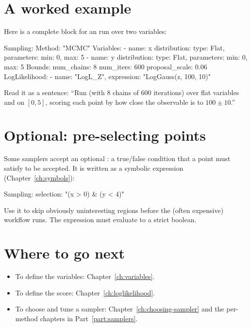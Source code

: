 \section{A worked example}
\label{sec:sampling-example}

Here is a complete  block for an  run over two variables:

\begin{yamlwin}
Sampling:
  Method: "MCMC"
  Variables:
    - name: x
      distribution: {type: Flat, parameters: {min: 0, max: 5}}
    - name: y
      distribution: {type: Flat, parameters: {min: 0, max: 5}}
  Bounds:
    num_chains: 8
    num_iters: 600
    proposal_scale: 0.06
  LogLikelihood:
    - {name: "LogL_Z", expression: "LogGauss(z, 100, 10)"}
\end{yamlwin}

\noindent Read it as a sentence: ``Run  (with 8 chains of 600 iterations) over flat
variables  and  on $[0,5]$, scoring each point by how close the observable
 is to $100 \pm 10$.''

\section{Optional: pre-selecting points}
\label{sec:sampling-selection}

Some samplers accept an optional : a true/false condition that a point must
satisfy to be accepted. It is written as a symbolic expression
(Chapter~\ref{ch:symbols}):

\begin{yamlwin}
Sampling:
  selection: "(x > 0) & (y < 4)"
\end{yamlwin}

\noindent Use it to skip obviously uninteresting regions before the (often expensive) workflow
runs. The expression must evaluate to a strict boolean.

\section{Where to go next}
\label{sec:sampling-next}

\begin{itemize}
  \item To define the variables: Chapter~\ref{ch:variables}.
  \item To define the score: Chapter~\ref{ch:loglikelihood}.
  \item To choose and tune a sampler: Chapter~\ref{ch:choosing-sampler} and the per-method
        chapters in Part~\ref{part:samplers}.
\end{itemize}
